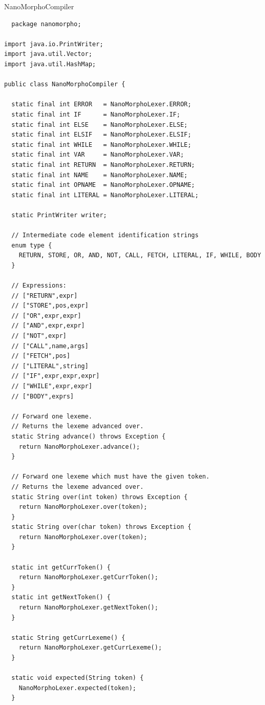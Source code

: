 \documentclass{homework}
\begin{document}
\begin{question}{NanoMorphoCompiler}
\end{question}
\begin{answer}
  \begin{verbatim}
  package nanomorpho;

import java.io.PrintWriter;
import java.util.Vector;
import java.util.HashMap;

public class NanoMorphoCompiler {

  static final int ERROR   = NanoMorphoLexer.ERROR;
  static final int IF      = NanoMorphoLexer.IF;
  static final int ELSE    = NanoMorphoLexer.ELSE;
  static final int ELSIF   = NanoMorphoLexer.ELSIF;
  static final int WHILE   = NanoMorphoLexer.WHILE;
  static final int VAR     = NanoMorphoLexer.VAR;
  static final int RETURN  = NanoMorphoLexer.RETURN;
  static final int NAME    = NanoMorphoLexer.NAME;
  static final int OPNAME  = NanoMorphoLexer.OPNAME;
  static final int LITERAL = NanoMorphoLexer.LITERAL;

  static PrintWriter writer;

  // Intermediate code element identification strings
  enum type {
    RETURN, STORE, OR, AND, NOT, CALL, FETCH, LITERAL, IF, WHILE, BODY
  }

  // Expressions:
  // ["RETURN",expr]
  // ["STORE",pos,expr]
  // ["OR",expr,expr]
  // ["AND",expr,expr]
  // ["NOT",expr]
  // ["CALL",name,args]
  // ["FETCH",pos]
  // ["LITERAL",string]
  // ["IF",expr,expr,expr]
  // ["WHILE",expr,expr]
  // ["BODY",exprs]

  // Forward one lexeme.
  // Returns the lexeme advanced over.
  static String advance() throws Exception {
    return NanoMorphoLexer.advance();
  }

  // Forward one lexeme which must have the given token.
  // Returns the lexeme advanced over.
  static String over(int token) throws Exception {
    return NanoMorphoLexer.over(token);
  }
  static String over(char token) throws Exception {
    return NanoMorphoLexer.over(token);
  }

  static int getCurrToken() {
    return NanoMorphoLexer.getCurrToken();
  }
  static int getNextToken() {
    return NanoMorphoLexer.getNextToken();
  }

  static String getCurrLexeme() {
    return NanoMorphoLexer.getCurrLexeme();
  }

  static void expected(String token) {
    NanoMorphoLexer.expected(token);
  }


\end{verbatim}
\end{answer}
\end{document}
